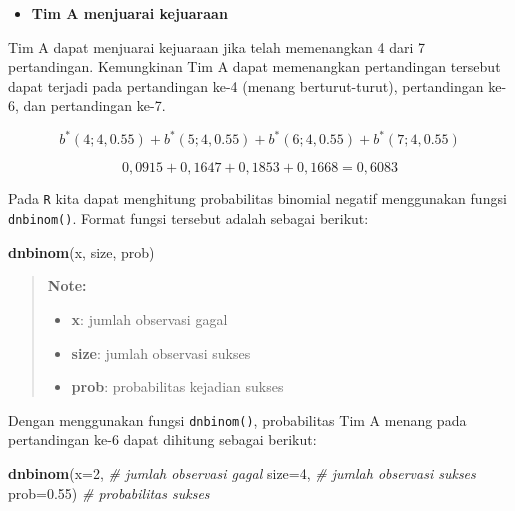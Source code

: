 \documentclass[]{book}
\newenvironment{Shaded}{\begin{snugshade}}{\end{snugshade}}
\newcommand{\KeywordTok}[1]{\textcolor[rgb]{0.13,0.29,0.53}{\textbf{#1}}}
\newcommand{\DataTypeTok}[1]{\textcolor[rgb]{0.13,0.29,0.53}{#1}}
\newcommand{\DecValTok}[1]{\textcolor[rgb]{0.00,0.00,0.81}{#1}}
\newcommand{\FloatTok}[1]{\textcolor[rgb]{0.00,0.00,0.81}{#1}}
\newcommand{\CommentTok}[1]{\textcolor[rgb]{0.56,0.35,0.01}{\textit{#1}}}
\newcommand{\NormalTok}[1]{#1}
\providecommand{\tightlist}{%
  \setlength{\itemsep}{0pt}\setlength{\parskip}{0pt}}
\begin{document}
\begin{itemize}
\tightlist
\item
  \textbf{Tim A menjuarai kejuaraan}
\end{itemize}

Tim A dapat menjuarai kejuaraan jika telah memenangkan 4 dari 7
pertandingan. Kemungkinan Tim A dapat memenangkan pertandingan tersebut
dapat terjadi pada pertandingan ke-4 (menang berturut-turut),
pertandingan ke-6, dan pertandingan ke-7.

\[
b^{\ast}\left(4;4,0.55\right)+b^{\ast}\left(5;4,0.55\right)+b^{\ast}\left(6;4,0.55\right)+b^{\ast}\left(7;4,0.55\right)
\]

\[
0,0915+0,1647+0,1853+0,1668=0,6083
\]

Pada \texttt{R} kita dapat menghitung probabilitas binomial negatif
menggunakan fungsi \texttt{dnbinom()}. Format fungsi tersebut adalah
sebagai berikut:

\begin{Shaded}
\begin{Highlighting}[]
\KeywordTok{dnbinom}\NormalTok{(x, size, prob)}
\end{Highlighting}
\end{Shaded}

\begin{quote}
\textbf{Note: }

\begin{itemize}
\tightlist
\item
  \textbf{x}: jumlah observasi gagal
\item
  \textbf{size}: jumlah observasi sukses
\item
  \textbf{prob}: probabilitas kejadian sukses
\end{itemize}
\end{quote}

Dengan menggunakan fungsi \texttt{dnbinom()}, probabilitas Tim A menang
pada pertandingan ke-6 dapat dihitung sebagai berikut:

\begin{Shaded}
\begin{Highlighting}[]
\KeywordTok{dnbinom}\NormalTok{(}\DataTypeTok{x=}\DecValTok{2}\NormalTok{, }\CommentTok{# jumlah observasi gagal}
        \DataTypeTok{size=}\DecValTok{4}\NormalTok{, }\CommentTok{# jumlah observasi sukses}
        \DataTypeTok{prob=}\FloatTok{0.55}\NormalTok{) }\CommentTok{# probabilitas sukses}
\end{Highlighting}
\end{Shaded}
\end{document}
